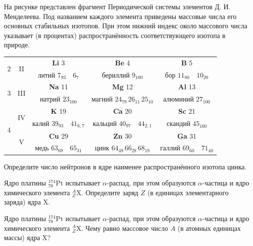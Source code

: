 \begin{taskbasic}[code={\label{task:nuclear_mendeleev_zinc_least_neutrons}}]
На рисунке представлен фрагмент Периодической системы элементов Д. И. Менделеева. Под названием каждого элемента приведены массовые числа его основных стабильных изотопов. При этом нижний индекс около массового числа указывает (в процентах) распространённость соответствующего изотопа в природе.

\nopagebreak\smallskip
\begin{center}
\small
\begin{tabular}{|c|c||c|c|c|}
\hline
\multirow{2}{*}{2} & \multirow{2}{*}{II} & \textbf{Li} \hfill 3 & \textbf{Be} \hfill 4 & \textbf{B} \hfill 5 \\
 & & литий $7_{93} \quad 6_7$ & бериллий $9_{100}$ & бор $11_{80} \quad 10_{20}$ \\ \hline
\multirow{2}{*}{3} & \multirow{2}{*}{III} & \textbf{Na} \hfill 11 & \textbf{Mg} \hfill 12 & \textbf{Al} \hfill 13 \\
 & & натрий $23_{100}$ & магний $24_{79} \, 26_{11} \, 25_{10}$ & алюминий $27_{100}$ \\ \hline
\multirow{4}{*}{4} & \multirow{2}{*}{IV} & \textbf{K} \hfill 19 & \textbf{Ca} \hfill 20 & \textbf{Sc} \hfill 21 \\
 & & калий $39_{93} \quad 41_{6,7}$ & кальций $40_{97} \quad 44_{2,1}$ & скандий $45_{100}$ \\ \cline{2-5}
 & \multirow{2}{*}{V} & \textbf{Cu} \hfill 29 & \textbf{Zn} \hfill 30 & \textbf{Ga} \hfill 31 \\
 & & медь $63_{69} \quad 65_{31}$ & цинк $64_{49} \, 66_{28} \, 68_{19}$ & галлий $69_{60} \quad 71_{40}$ \\ \hline
\end{tabular}
\end{center}
\smallskip

Определите число нейтронов в ядре наименее распространённого изотопа цинка.

\end{taskbasic}

\begin{taskbasic}[code={\label{task:nuclear_alpha_platinum_charge}}]
Ядро платины $^{174}_{78}\text{Pt}$ испытывает $\alpha$-распад, при этом образуются $\alpha$-частица и ядро химического элемента $^A_Z\text{X}$. Определите заряд $Z$ (в единицах элементарного заряда) ядра $\text{X}$.

\end{taskbasic}

\begin{taskbasic}[code={\label{task:nuclear_alpha_platinum_mass}}]
Ядро платины $^{174}_{78}\text{Pt}$ испытывает $\alpha$-распад, при этом образуются $\alpha$-частица и ядро химического элемента $^A_Z\text{X}$. Чему равно массовое число $A$ (в атомных единицах массы) ядра $\text{X}$?

\end{taskbasic}
